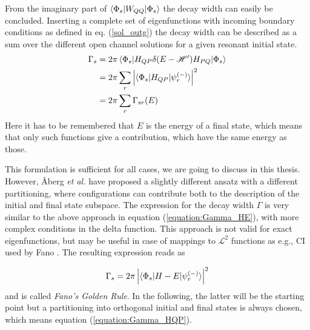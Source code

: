 

From the imaginary part of $\braket{\Phi_s|W_{QQ}|\Phi_s}$ the decay width can
easily be concluded. Inserting a complete set
of eigenfunctions with incoming boundary conditions as defined in
eq. (\ref{sol_outg}) the decay width can be described
as a sum over the different open channel solutions for a given resonant initial state.
\begin{align}
  \Gamma_s & = 2 \pi \braket{\Phi_s|H_{QP}\delta(E - \mathscr{H}')H_{PQ}|\Phi_s}
               \label{equation:Gamma_HE}\\
           & = 2 \pi \sum\limits_r \left | \braket{\Phi_s|H_{QP}|\psi_r^{(-)}} \right|^2
                 \label{equation:Gamma_HQP}\\
           & = 2 \pi \sum\limits_r \Gamma_{sr}(E)
\end{align}
Here it has to be remembered that $E$ is the energy of a final state, which means that
only such functions give a contribution, which have the same energy as those.

This formulation is sufficient for all cases, we are going to discuss in this thesis.
However, {\AA}berg \textit{et al.} have proposed a slightly different ansatz with
a different partitioning, where configurations can contribute both to the description
of the initial and final state subspace. The expression for the decay width $\Gamma$
is very similar to the above approach in equation (\ref{equation:Gamma_HE}), with more
complex conditions in the delta function.\cite{Aaberg82} This approach is not valid for exact
eigenfunctions, but may be useful in case of mappings to $\mathcal{L}^2$ functions as
e.g., \ac{CI} used by Fano \cite{Fano61}. The resulting expression reads as

\begin{equation}
  \Gamma_s = 2 \pi \left| \braket{\Phi_s|H-E|\psi_r^{(-)}} \right| ^2
\end{equation}
and is called \emph{Fano's Golden Rule}. In the following, the latter will be
the starting point
but a partitioning into orthogonal initial and final
states is always chosen, which means equation (\ref{equation:Gamma_HQP}).
